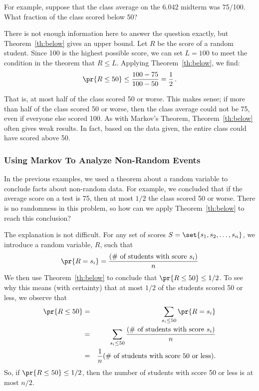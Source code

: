 \begin{editingnotes}
For example, suppose that the class average on the 6.042 midterm was
75/100.  What fraction of the class scored below 50?

There is not enough information here to answer the question exactly,
but Theorem~\ref{th:below} gives an upper bound.  Let $R$ be the score
of a random student.  Since 100 is the highest possible score, we
can set $L = 100$ to meet the condition in the theorem that $R \leq
L$.  Applying Theorem~\ref{th:below}, we find:
\begin{displaymath}
  \pr{R \leq 50} \leq \frac{100 - 75}{100 - 50} = \frac{1}{2}\,.
\end{displaymath}

That is, at most half of the class scored 50 or worse.  This makes
sense; if more than half of the class scored 50 or worse, then the
class average could not be 75, even if everyone else scored 100.
As with Markov's Theorem, Theorem~\ref{th:below} often gives weak
results.  In fact, based on the data given, the entire class could
have scored above 50.

\subsubsection*{Using Markov To Analyze Non-Random Events}

In the previous examples, we used a theorem about a random variable to
conclude facts about non-random data.  For example, we concluded that
if the average score on a test is 75, then at most $1/2$ the
class scored 50 or worse.  There is no randomness in this problem,
so how can we apply Theorem~\ref{th:below} to reach this conclusion?

The explanation is not difficult.  For any set of scores $S = \set{s_1,
s_2, \dots, s_n}$, we introduce a random variable, $R$, such that
\[
\pr{R = s_i} = \frac{\text{(\# of students with score $s_i$)}}{n}
\]
We then use Theorem~\ref{th:below} to conclude that $\pr{R \leq 50}
\leq 1/2$.  To see why this means (with certainty) that at most
$1/2$ of the students scored 50 or less, we observe that
\begin{eqnarray*}
\pr{R \leq 50}  & = & \sum_{s_i \leq 50} \pr{R = s_i} \\
  & = & \sum_{s_i \leq 50} \frac{\text{(\# of students with score $s_i$)}}{n} \\
  & = & \frac{1}{n} \text{(\# of students with score 50 or less)}.
\end{eqnarray*}
So, if $\pr{R \leq 50} \leq 1/2$, then the number of students
with score 50 or less is at most $n/2$.

\end{editingnotes}

